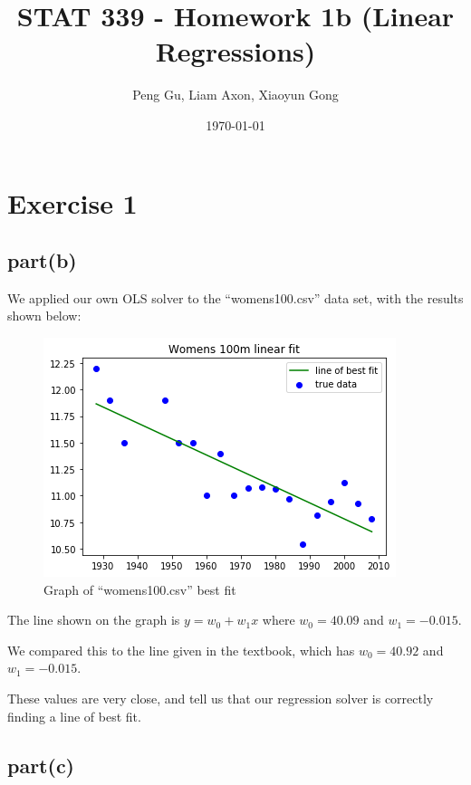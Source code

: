 \documentclass[12pt]{amsart}
\begin{document}
\title[STAT339 - Machine Learning]{STAT 339 - Homework 1b (Linear Regressions)}

\author{Peng Gu, Liam Axon, Xiaoyun Gong} 
\date{\today}

\maketitle

\section*{Exercise 1}

\subsection*{part(b)}

We applied our own OLS solver to the ``womens100.csv'' data set, with the results shown below:

\begin{figure}[H]
    \centering
    \includegraphics[scale=0.8]{Figure_womesn100.png}
    \caption{Graph of ``womens100.csv'' best fit}
    \label{fig:my_label}
\end{figure}

The line shown on the graph is $y = w_0 + w_1 x$ where $w_0 = 40.09$ and $w_1 = -0.015$.

We compared this to the line given in the textbook, which has $w_0 = 40.92$ and $w_1 = -0.015$.

These values are very close, and tell us that our regression solver is correctly finding a line of best fit.

\subsection*{part(c)}
\end{document}
